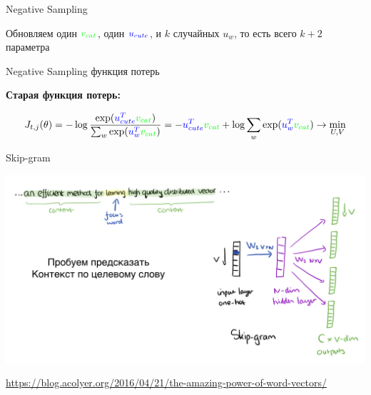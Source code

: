 \documentclass[notes,12pt, aspectratio=169]{beamer}
\begin{document}
\begin{frame}{Negative Sampling}
\vfill

Обновляем один ${ \color{green}  v_{cat}}$, один ${ \color{blue}  u_{cute}}$, и $k$ случайных  $u_w$, то есть всего $k + 2$  параметра
\end{frame}


\begin{frame}{Negative Sampling функция потерь}
	
	\textbf{Старая функция потерь:}

	\[ 
	J_{t,j}(\theta) = - \log \frac{ \exp({\color{blue}  u^T_{cute}} {\color{green}  v_{cat}} )}{\sum_w \exp({\color{blue}  u_w^T} {\color{green} v_{cat} }) }   = - {\color{blue}  u^T_{cute}} {\color{green}  v_{cat}} +  \log \sum_w \exp({\color{blue}  u_w^T} {\color{green} v_{cat} }) \to \min_{U,V}
	\]

	\vspace{1cm} 



\end{frame} 


\begin{frame}{Skip-gram}
	\begin{center}
		\includegraphics[width=.9\linewidth]{skipgram.png}
	\end{center}
	\vfill
	\footnotesize  {\color{blue} \url{https://blog.acolyer.org/2016/04/21/the-amazing-power-of-word-vectors/}}
\end{frame} 
\end{document}
